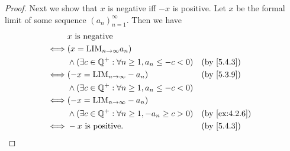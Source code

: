 \begin{proof}
  Next we show that \(x\) is negative iff \(-x\) is positive.
  Let \(x\) be the formal limit of some sequence \((a_n)_{n = 1}^{\infty}\).
  Then we have
  \begin{align*}
         & x \text{ is negative}                                                             \\
    \iff & (x = \text{LIM}_{n \to \infty} a_n)                                               \\
         & \land (\exists c \in \Q^+ : \forall n \geq 1, a_n \leq -c < 0) &  & \by{5.4.3}    \\
    \iff & (-x = \text{LIM}_{n \to \infty} -a_n)                          &  & \by{5.3.9}    \\
         & \land (\exists c \in \Q^+ : \forall n \geq 1, a_n \leq -c < 0)                    \\
    \iff & (-x = \text{LIM}_{n \to \infty} -a_n)                                             \\
         & \land (\exists c \in \Q^+ : \forall n \geq 1, -a_n \geq c > 0) &  & \by{ex:4.2.6} \\
    \iff & -x \text{ is positive}.                                        &  & \by{5.4.3}
  \end{align*}


\end{proof}
